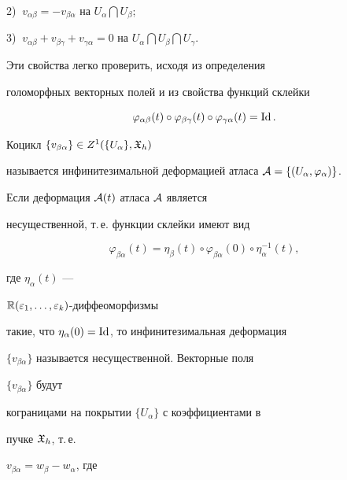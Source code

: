 2) $ \ v_{\alpha \beta}=- v_{\beta \alpha}$ на $ U_{\alpha}


\bigcap U_{\beta}$;





3) $ \ v_{\alpha \beta} + v_{\beta \gamma} + v_{\gamma


\alpha}=0 $ на $ U_{\alpha} \bigcap U_{\beta} \bigcap


U_{\gamma}$.





\noindent{}Эти свойства легко проверить, исходя из определения 


голоморфных векторных полей и из свойства функций склейки


$$ 


\varphi_{\alpha \beta} (t) \circ \varphi_{\beta \gamma} (t)


\circ \varphi_{\gamma \alpha} (t)=\Id.


$$





Коцикл $\{v_{\beta \alpha}\}\in Z^1 (\{U_{\alpha}\},{\frak X}_h)$


называется инфинитезимальной деформацией атласа ${\cal


A}=\{(U_{\alpha}, \varphi_{\alpha})\}$.


Если деформация ${\cal A}(t)$ атласа ${\cal A}$ является


несущественной, т.\,е. функции склейки имеют вид


$$ 


\varphi_{\beta \alpha} (t)=\eta_{\beta}(t) \circ


\varphi_{\beta \alpha} (0) \circ \eta_{\alpha}^{-1} (t),


$$


где $\eta_{\alpha}(t)$ ---


${\Bbb R} (\varepsilon_1, \dotsc, \varepsilon_k)$-диффеоморфизмы


такие, что $\eta_{\alpha}(0) =\operatorname{Id}$, то инфинитезимальная деформация


$\{v_{\beta \alpha}\}$ называется несущественной. Векторные поля


$\{v_{\beta \alpha}\}$ будут


кограницами на покрытии $\{U_{\alpha}\}$ с коэффициентами в


пучке ${\frak X}_h$, т.\,е.


$v_{\beta \alpha}=w_{\beta} - w_{\alpha}$, где


